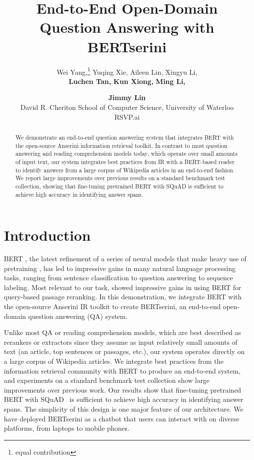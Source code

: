 \documentclass[11pt,a4paper]{article}
\title{End-to-End Open-Domain Question Answering with BERTserini}
\author{Wei Yang,\thanks{\hspace{0.25cm}equal contribution} \hspace{0.1cm} Yuqing Xie,\samethanks \hspace{0.1cm}
Aileen Lin,
Xingyu Li,\\
{\bf Luchen Tan,} {\bf Kun Xiong,} {\bf Ming Li,} \and {\bf Jimmy Lin}\vspace{0.1cm}\\
 David R. Cheriton School of Computer Science, University of Waterloo \\
 RSVP.ai}
\date{}
\begin{document}
\maketitle
\begin{abstract}
We demonstrate an end-to-end question answering system that integrates BERT with the open-source Anserini information retrieval toolkit.
In contrast to most question answering and reading comprehension models today, which operate over small amounts of input text, our system integrates best practices from IR with a BERT-based reader to identify answers from a large corpus of Wikipedia articles in an end-to-end fashion.
We report large improvements over previous results on a standard benchmark test collection, showing that fine-tuning pretrained BERT with SQuAD is sufficient to achieve high accuracy in identifying answer spans.
\end{abstract}

\section{Introduction}

BERT \cite{devlin2018bert}, the latest refinement of a series of neural models that make heavy use of pretraining \cite{N18-1202,radford2018improving}, has led to impressive gains in many natural language processing tasks, ranging from sentence classification to question answering to sequence labeling.
Most relevant to our task, \citet{nogueira2019passage} showed impressive gains in using BERT for query-based passage reranking.
In this demonstration, we integrate BERT with the open-source Anserini IR toolkit to create BERTserini, an end-to-end open-domain question answering (QA) system.

Unlike most QA or reading comprehension models, which are best described as rerankers or extractors since they assume as input relatively small amounts of text (an article, top  sentences or passages, etc.), our system operates directly on a large corpus of Wikipedia articles.
We integrate best practices from the information retrieval community with BERT to produce an end-to-end system, and experiments on a standard benchmark test collection show large improvements over previous work.
Our results show that fine-tuning pretrained BERT with SQuAD~\cite{D16-1264} is sufficient to achieve high accuracy in identifying answer spans.
The simplicity of this design is one major feature of our architecture.
We have deployed BERTserini as a chatbot that users can interact with on diverse platforms, from laptops to mobile phones.
\end{document}

